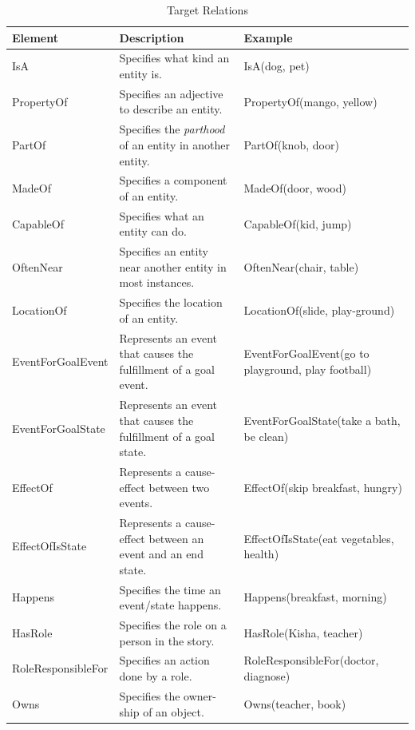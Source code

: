 \begin{table}[H]   %
\centering
\caption{Target Relations} \vspace{0.25em}
\begin{tabular}{|p{3.5cm}|p{4cm}|p{5.5cm}|} \hline
Element & Description & Example \\ \hline
IsA					& Specifies what kind an entity is. & IsA(dog, pet) \\ \hline
PropertyOf			& Specifies an adjective to describe an entity. & PropertyOf(mango, yellow) \\ \hline
PartOf				& Specifies the \textit{parthood} of an entity in another entity. & PartOf(knob, door) \\ \hline
MadeOf				& Specifies a component of an entity. & MadeOf(door, wood) \\ \hline
CapableOf			& Specifies what an entity can do. & CapableOf(kid, jump) \\ \hline
OftenNear			& Specifies an entity near another entity in most instances. & OftenNear(chair, table) \\ \hline
LocationOf			& Specifies the location of an entity. & LocationOf(slide, play-ground) \\ \hline
EventForGoalEvent	& Represents an event that causes the fulfillment of a goal event. & EventForGoalEvent(go to playground, play football) \\ \hline
EventForGoalState	& Represents an event that causes the fulfillment of a goal state. & EventForGoalState(take a bath, be clean) \\ \hline
EffectOf			& Represents a cause-effect between two events. & EffectOf(skip breakfast, hungry) \\ \hline
EffectOfIsState		& Represents a cause-effect between an event and an end state. & EffectOfIsState(eat vegetables, health) \\ \hline
Happens				& Specifies the time an event/state happens. & Happens(breakfast, morning) \\ \hline
HasRole				& Specifies the role on a person in the story. & HasRole(Kisha, teacher) \\ \hline
RoleResponsibleFor	& Specifies an action done by a role. & RoleResponsibleFor(doctor, diagnose) \\ \hline
Owns				& Specifies the owner-ship of an object. & Owns(teacher, book) \\ \hline
\end{tabular}
\label{tab:targetrel}
\end{table}

